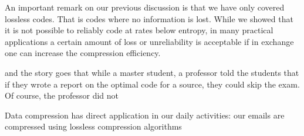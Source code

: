An important remark on our previous discussion is that we have only covered lossless codes. That is codes where no information is lost. While we showed that it is not possible to reliably code at rates below entropy, in many practical applications a certain amount of loss or unreliability is acceptable if in exchange one can increase the compression efficiency. 

and the story goes that while a master student, a professor told the students that if they wrote a report on the optimal code for a source, they could skip the exam. Of course, the professor did not 

Data compression has direct application in our daily activities: our emails are compressed using lossless compression algorithms
